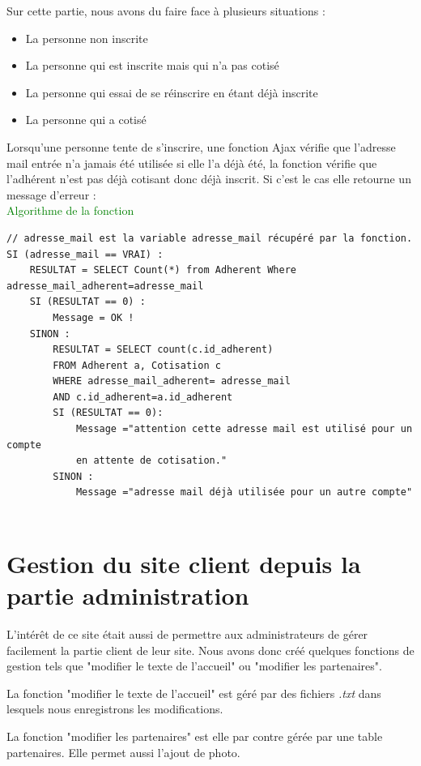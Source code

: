 \documentclass[11pt,a4paper,titlepage]{report}
\begin{document}
Sur cette partie, nous avons du faire face à plusieurs situations :
\begin{itemize}
\item La personne non inscrite
\item La personne qui est inscrite mais qui n'a pas cotisé
\item La personne qui essai de se réinscrire en étant déjà inscrite
\item La personne qui a cotisé
\end{itemize}

Lorsqu'une personne tente de s'inscrire, une fonction Ajax vérifie que l'adresse mail entrée n'a jamais été utilisée si elle l'a déjà été, la fonction vérifie que l'adhérent n'est pas déjà cotisant donc déjà inscrit. Si c'est le cas elle retourne un message d'erreur :
\\
\textcolor{green}{Algorithme de la fonction}
\begin{verbatim}
// adresse_mail est la variable adresse_mail récupéré par la fonction.
SI (adresse_mail == VRAI) :
    RESULTAT = SELECT Count(*) from Adherent Where    	adresse_mail_adherent=adresse_mail
    SI (RESULTAT == 0) :
        Message = OK ! 
    SINON :
        RESULTAT = SELECT count(c.id_adherent)
        FROM Adherent a, Cotisation c
        WHERE adresse_mail_adherent= adresse_mail 
        AND c.id_adherent=a.id_adherent
        SI (RESULTAT == 0):
            Message ="attention cette adresse mail est utilisé pour un compte
            en attente de cotisation." 
        SINON :
            Message ="adresse mail déjà utilisée pour un autre compte"
		
\end{verbatim}


\section{Gestion du site client depuis la partie administration}
L'intérêt de ce site était aussi de permettre aux administrateurs de gérer facilement la partie client de leur site. Nous avons donc créé quelques fonctions de gestion tels que "modifier le texte de l'accueil" ou "modifier les partenaires". 

La fonction "modifier le texte de l'accueil" est géré par des fichiers \textit{.txt} dans lesquels nous enregistrons les modifications.

La fonction "modifier les partenaires" est elle par contre gérée par une table partenaires. 
Elle permet aussi l'ajout de photo.
\end{document}
